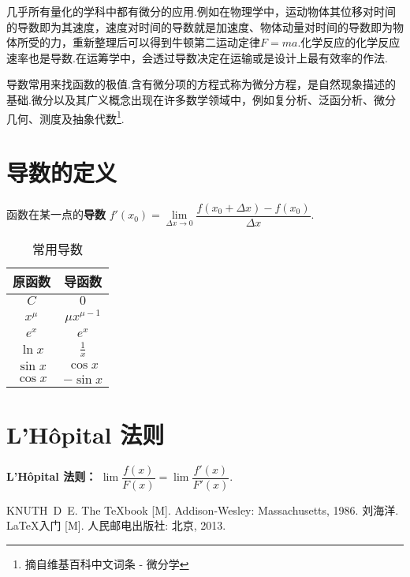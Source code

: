 \documentclass[
    b5paper,  %
    decoration,  %
]{qyxf-book}
\begin{document}
几乎所有量化的学科中都有微分的应用.例如在物理学中，运动物体其位移对时间的导数即为其速度，速度对时间的导数就是加速度、物体动量对时间的导数即为物体所受的力，重新整理后可以得到牛顿第二运动定律$F=ma$.化学反应的化学反应速率也是导数.在运筹学中，会透过导数决定在运输或是设计上最有效率的作法.

导数常用来找函数的极值.含有微分项的方程式称为微分方程，是自然现象描述的基础.微分以及其广义概念出现在许多数学领域中，例如复分析、泛函分析、微分几何、测度及抽象代数\footnote{摘自维基百科中文词条 - 微分学\cite{ref:wiki-diff-calculus}}.

\newpage

\section{导数的定义}

\begin{define}
	函数在某一点的\textbf{导数} $f'(x_0)=\lim\limits_{\Delta x \to 0}\dfrac{f(x_0 + \Delta x) - f(x_0)}{\Delta x}$.
\end{define}

\begin{table}[ht]
\centering
\caption{常用导数}
\begin{tabular}{c|c}
\toprule
\textbf{原函数} & \textbf{导函数} \\
\midrule
$C$      & $0$               \\
$x^\mu$  & $\mu x^{\mu - 1}$ \\
$e^x$    & $e^x$             \\
$\ln x$  & $\frac{1}{x}$     \\
$\sin x$ & $\cos x$          \\
$\cos x$ & $-\sin x$         \\
\bottomrule
\end{tabular}
\end{table}

\newpage

\section{L'Hôpital 法则}

\begin{theorem}
    \textbf{L'Hôpital 法则：} $\lim \dfrac{f(x)}{F(x)} = \lim \dfrac{f'(x)}{F'(x)}$.
\end{theorem}

\begin{thebibliography}{99}
 KNUTH~D~E. The \TeX book [M]. Addison-Wesley: Massachusetts, 1986.
 刘海洋. \LaTeX 入门 [M]. 人民邮电出版社: 北京, 2013.
\end{thebibliography}
\end{document}
